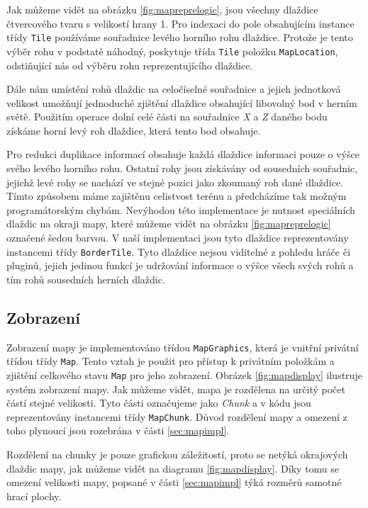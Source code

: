 Jak můžeme vidět na obrázku \ref{fig:mapreprelogic}, jsou všechny dlaždice čtvercového tvaru s velikostí hrany 1. Pro indexaci do pole obsahujícím instance třídy \texttt{Tile} používáme souřadnice levého horního rohu dlaždice. Protože je tento výběr rohu v podstatě náhodný, poskytuje třída \texttt{Tile} položku \texttt{MapLocation}, odstiňující nás od výběru rohu reprezentujícího dlaždice.

Dále nám umístění rohů dlaždic na celočíselné souřadnice a jejich jednotková velikost umožňují jednoduché zjištění dlaždice obsahující libovolný bod v herním světě. Použitím operace dolní celé části na souřadnice \textit{X} a \textit{Z} daného bodu získáme horní levý roh dlaždice, která tento bod obsahuje.

Pro redukci duplikace informací obsahuje každá dlaždice informaci pouze o výšce svého levého horního rohu. Ostatní rohy jsou získávány od sousedních souřadnic, jejichž levé rohy se nachází ve stejné pozici jako zkoumaný roh dané dlaždice. Tímto způsobem máme zajištěnu celistvost terénu a předcházíme tak možným programátorským chybám. Nevýhodou této implementace je nutnost speciálních dlaždic na okraji mapy, které můžeme vidět na obrázku \ref{fig:mapreprelogic} označené šedou barvou. V naší implementaci jsou tyto dlaždice reprezentovány instancemi třídy \texttt{BorderTile}. Tyto dlaždice nejsou viditelné z pohledu hráče či pluginů, jejich jedinou funkcí je udržování informace o výšce všech svých rohů a tím rohů sousedních herních dlaždic. 


\subsection{Zobrazení}
Zobrazení mapy je implementováno třídou \texttt{MapGraphics}, která je vnitřní privátní třídou třídy \texttt{Map}. Tento vztah je použit pro přístup k privátním položkám a zjištění celkového stavu \texttt{Map} pro jeho zobrazení. Obrázek \ref{fig:mapdisplay} ilustruje systém zobrazení mapy. Jak můžeme vidět, mapa je rozdělena na určitý počet částí stejné velikosti. Tyto části označujeme jako \textit{Chunk} a v kódu jsou reprezentovány instancemi třídy \texttt{MapChunk}. Důvod rozdělení mapy a omezení z toho plynoucí jsou rozebrána v části \ref{sec:mapimpl}. 

Rozdělení na chunky je pouze grafickou záležitostí, proto se netýká okrajových dlaždic mapy, jak můžeme vidět na diagramu \ref{fig:mapdisplay}. Díky tomu se omezení velikosti mapy, popsané v části \ref{sec:mapimpl} týká rozměrů samotné hrací plochy.

